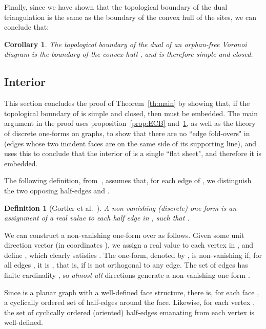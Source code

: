 \documentclass[11pt]{article}
\newtheorem{definition}{Definition}
\newtheorem{corollary}{Corollary}
\begin{document}
Finally, since we have shown that the topological boundary of the dual triangulation is the 
	same as the boundary of the convex hull of the sites, we can conclude that:


\begin{corollary}\label{cor:boundary}
The topological boundary of the dual of an orphan-free Voronoi diagram 
	is the boundary of the convex hull , and is therefore simple and closed. 
\end{corollary}




\subsection{Interior}\label{sec:interior}


This section concludes the proof of Theorem~\ref{th:main} by showing that, 
	if the topological boundary of  is simple and closed, then  must be embedded.
The main argument in the proof 
uses proposition~\ref{prop:ECB} and~\ref{cor:boundary}, as well as the theory of discrete one-forms on graphs, 
to show that there are no
``edge fold-overs" in  (edges whose two incident faces are on the same side of its supporting line), 
and uses this to conclude that the interior of  is a single ``flat sheet", and therefore it is embedded. 




The following definition, from~\cite{1form},  assumes that, for each edge  of , 
we distinguish the two opposing half-edges  and . 


\begin{definition}[Gortler et al.\ \cite{1form}]\label{def:1form}
A non-vanishing (discrete) one-form   is an assignment of a real value
 to each half edge  in , such that 
. 
\end{definition}

We can construct a non-vanishing one-form
over  as follows. 
Given some unit direction vector 
(in coordinates ), 
we assign a real
value  to each vertex  in , and define 
, which clearly satisfies 
. The one-form, denoted by , 
is non-vanishing if, for all edges , 
it is , 
that is, if  is not orthogonal to any edge. 
The set of edges has finite cardinality ,  
so \emph{almost all} directions  generate a non-vanishing one-form . 


Since  is a planar graph with a well-defined face structure,
there is, for each face , a cyclically ordered set
 of half-edges around the face. 
Likewise, for each vertex , the set  of cyclically ordered
(oriented) half-edges emanating from each vertex is well-defined. 
\end{document}
